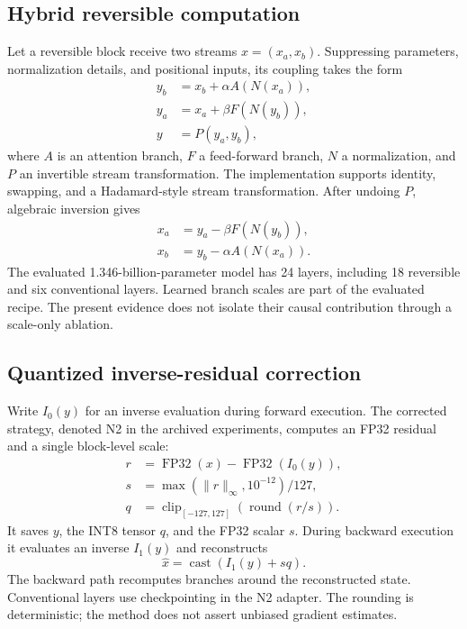\documentclass[10pt]{article}
\begin{document}
\subsection{Hybrid reversible computation}
Let a reversible block receive two streams $x=(x_a,x_b)$. Suppressing parameters, normalization details, and positional inputs, its coupling takes the form
\begin{align}
 y_b &= x_b+\alpha A(N(x_a)),\\
 y_a &= x_a+\beta F(N(y_b)),\\
 y &= P(y_a,y_b),
\end{align}
where $A$ is an attention branch, $F$ a feed-forward branch, $N$ a normalization, and $P$ an invertible stream transformation. The implementation supports identity, swapping, and a Hadamard-style stream transformation. After undoing $P$, algebraic inversion gives
\begin{align}
 x_a &= y_a-\beta F(N(y_b)),\\
 x_b &= y_b-\alpha A(N(x_a)).
\end{align}
The evaluated 1.346-billion-parameter model has 24 layers, including 18 reversible and six conventional layers. Learned branch scales are part of the evaluated recipe. The present evidence does not isolate their causal contribution through a scale-only ablation.

\subsection{Quantized inverse-residual correction}
Write $I_0(y)$ for an inverse evaluation during forward execution. The corrected strategy, denoted N2 in the archived experiments, computes an FP32 residual and a single block-level scale:
\begin{align}
 r &= \operatorname{FP32}(x)-\operatorname{FP32}(I_0(y)),\\
 s &= \max(\lVert r\rVert_\infty,10^{-12})/127,\\
 q &= \operatorname{clip}_{[-127,127]}(\operatorname{round}(r/s)).
\end{align}
It saves $y$, the INT8 tensor $q$, and the FP32 scalar $s$. During backward execution it evaluates an inverse $I_1(y)$ and reconstructs
\begin{equation}
 \widehat{x}=\operatorname{cast}(I_1(y)+sq).
\end{equation}
The backward path recomputes branches around the reconstructed state. Conventional layers use checkpointing in the N2 adapter. The rounding is deterministic; the method does not assert unbiased gradient estimates.
\end{document}

